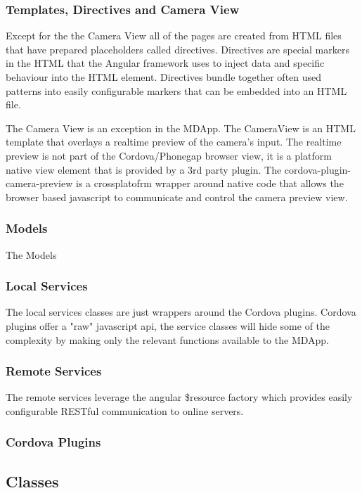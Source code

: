 \subsubsection{Templates, Directives and Camera View}
Except for the the Camera View all of the pages are created from HTML files that have prepared placeholders called directives. Directives are special markers in the HTML that the Angular framework uses to inject data and specific behaviour into the HTML element. Directives bundle together often used patterns into easily configurable markers that can be embedded into an HTML file.

The Camera View is an exception in the MDApp. The CameraView is an HTML template that overlays a realtime preview of the camera’s input. The realtime preview is not part of the Cordova/Phonegap browser view, it is a platform native view element that is provided by a 3rd party plugin. The cordova-plugin-camera-preview is a crossplatofrm wrapper around native code that allows the browser based javascript to communicate and control the camera preview view.

\subsubsection{Models}
The Models


\subsubsection{Local Services}
The local services classes are just wrappers around the Cordova plugins. Cordova plugins offer a "raw" javascript api, the service classes will hide some of the complexity by making only the relevant functions available to the MDApp.

\subsubsection{Remote Services}
The remote services leverage the angular \$resource factory which provides easily configurable RESTful communication to online servers.

\subsubsection{Cordova Plugins}

\subsection{Classes}